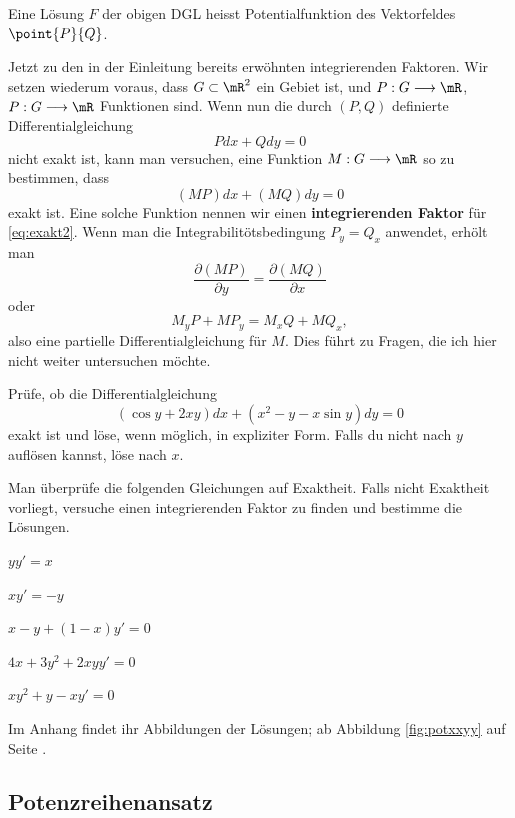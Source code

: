 \documentclass[%
draft,
11pt,%
twoside,%
titlepage,%
german,%
headsepline%
]{scrartcl}
\begin{document}
\begin{bem}
Eine L\"osung $F$ der obigen DGL heisst Potentialfunktion des Vektorfeldes $\point{P}{Q}$.
\end{bem}

Jetzt zu den in der Einleitung bereits erw\"ohnten integrierenden Faktoren. Wir setzen wiederum voraus, dass $G\subset\mR^2$ ein Gebiet ist, und $P:G\longrightarrow\mR$, $P:G\longrightarrow\mR$ Funktionen sind. Wenn nun die durch $(P,Q)$ definierte Differentialgleichung
\begin{equation}\label{eq:exakt2}
Pdx+Qdy=0
\end{equation}
nicht exakt ist, kann man versuchen, eine Funktion $M:G\longrightarrow\mR$ so zu bestimmen, dass
$$(MP)dx+(MQ)dy=0$$
exakt ist. Eine solche Funktion nennen wir einen \textbf{integrierenden Faktor} f\"ur \eqref{eq:exakt2}. Wenn man die Integrabilit\"otsbedingung $P_y=Q_x$ anwendet, erh\"olt man
$$\frac{\partial(MP)}{\partial y}=\frac{\partial(MQ)}{\partial x}$$
oder
$$M_yP+MP_y=M_xQ+MQ_x,$$
also eine partielle Differentialgleichung f\"ur $M$. Dies f\"uhrt zu Fragen, die ich hier nicht weiter untersuchen m\"ochte.

\begin{ueb}
Pr\"ufe, ob die Differentialgleichung
$$(\cos y+2xy)dx+(x^2-y-x\sin y)dy=0$$
exakt ist und l\"ose, wenn m\"oglich, in expliziter Form. Falls du nicht nach $y$ aufl\"osen kannst, l\"ose nach $x$.
\end{ueb}


\begin{ueb}
Man \"uberpr\"ufe die folgenden Gleichungen auf Exaktheit. Falls nicht Exaktheit vorliegt, versuche einen integrierenden Faktor zu finden und bestimme die L\"osungen.
\begin{enumeratea}
\item $yy'=x$
\item $xy'=-y$
\item $x-y+(1-x)y'=0$
\item $4x+3y^2+2xyy'=0$
\item $xy^2+y-xy'=0$
\end{enumeratea}
\end{ueb}

Im Anhang findet ihr Abbildungen der Lösungen; ab Abbildung \ref{fig:potxxyy} auf Seite \pageref{fig:potxxyy}.

\subsection{Potenzreihenansatz}
\end{document}
